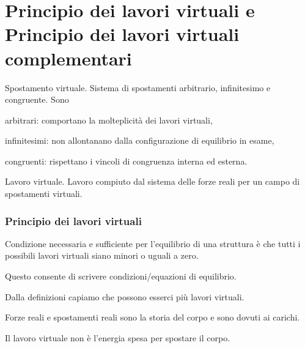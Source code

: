 \section{Principio dei lavori virtuali e Principio dei lavori virtuali complementari}


\begin{definizioneBox}
Spostamento virtuale. Sistema di spostamenti arbitrario, infinitesimo e congruente. Sono
\begin{compactitem}
    \item arbitrari: comportano la molteplicità dei lavori virtuali,\\
    \item infinitesimi: non allontanano dalla configurazione di equilibrio in esame,\\
    \item congruenti: rispettano i vincoli di congruenza interna ed esterna.
\end{compactitem}
\end{definizioneBox}
\begin{definizioneBox}
Lavoro virtuale. Lavoro compiuto dal sistema delle forze reali per un campo di spostamenti virtuali.
\end{definizioneBox}

\subsubsection*{Principio dei lavori virtuali}
\begin{enunciatoBox}
    Condizione necessaria e sufficiente per l'equilibrio di una struttura è che tutti i possibili lavori virtuali siano minori o uguali a zero.
\end{enunciatoBox}



\begin{compactitem}
    \item Questo consente di scrivere condizioni/equazioni di equilibrio.\\
    \item Dalla definizioni capiamo che possono esserci più lavori virtuali.\\
    \item Forze reali e spostamenti reali sono la storia del corpo e sono dovuti ai carichi.\\
    \item Il lavoro virtuale non è l'energia spesa per spostare il corpo.
\end{compactitem}

